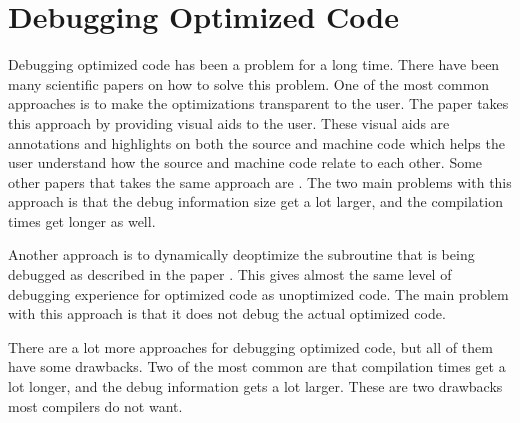 


\section{Debugging Optimized Code}


Debugging optimized code has been a problem for a long time.
There have been many scientific papers on how to solve this problem.
One of the most common approaches is to make the optimizations transparent to the user.
The paper \cite{edselc.2-52.0-8497669319919920107} takes this approach by providing visual aids to the user.
These visual aids are annotations and highlights on both the source and machine code which helps the user understand how the source and machine code relate to each other.
Some other papers that takes the same  approach are \cite{adl1996source, edselc.2-52.0-002842706219940105}.
The two main problems with this approach is that the debug information size get a lot larger, and the compilation times get longer as well.


Another approach is to dynamically deoptimize the subroutine that is being debugged as described in the paper \cite{edselc.2-52.0-002699386519920107}.
This gives almost the same level of debugging experience for optimized code as unoptimized code.
The main problem with this approach is that it does not debug the actual optimized code.


There are a lot more approaches for debugging optimized code, but all of them have some drawbacks.
Two of the most common are that compilation times get a lot longer, and the debug information gets a lot larger.
These are two drawbacks most compilers do not want.



